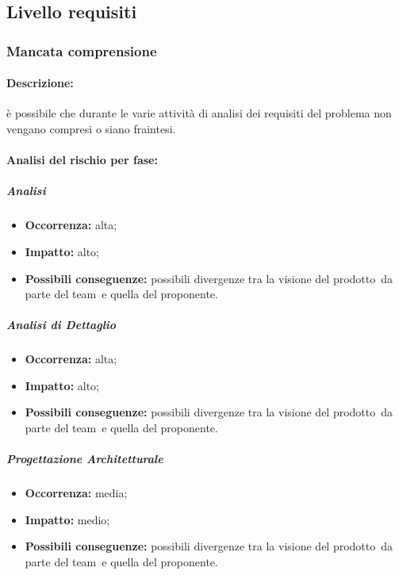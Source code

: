 \documentclass[../PianoProgetto.tex]{subfiles}
\begin{document}
\newpage
\subsection{Livello requisiti}

\subsubsection{Mancata comprensione}
\label{sec:Mancata comprensione}

	\paragraph*{Descrizione:} è possibile che durante le varie attività di analisi dei requisiti del problema non vengano compresi o siano fraintesi.
	
	\paragraph*{Analisi del rischio per fase:} 

		\subparagraph*{Analisi}
			\begin{itemize}[label={-}]
				\item \textbf{Occorrenza:} alta;
				\item \textbf{Impatto:} alto;
				\item \textbf{Possibili conseguenze:} possibili divergenze tra la visione del prodotto\g\ da parte del team\g\ e quella del proponente.
			\end{itemize}
			
		\subparagraph*{Analisi di Dettaglio}
			\begin{itemize}[label={-}]
				\item \textbf{Occorrenza:} alta;
				\item \textbf{Impatto:} alto;
				\item \textbf{Possibili conseguenze:} possibili divergenze tra la visione del prodotto\g\ da parte del team\g\ e quella del proponente.
			\end{itemize}
			
		\subparagraph*{Progettazione Architetturale}
			\begin{itemize}[label={-}]
				\item \textbf{Occorrenza:} media;
				\item \textbf{Impatto:} medio;
				\item \textbf{Possibili conseguenze:} possibili divergenze tra la visione del prodotto\g\ da parte del team\g\ e quella del proponente.
			\end{itemize}
			
\end{document}
